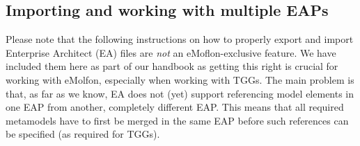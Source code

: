 \newpage
\hypertarget{multiEAP}{}
\subsection{Importing and working with multiple EAPs}
\visHeader

Please note that the following instructions on how to properly export and import Enterprise Architect (EA) files are \emph{not} an eMoflon-exclusive feature.
We have included them here as part of our handbook as getting this right is crucial for working with eMolfon, especially when working with TGGs. The main
problem is that, as far as we know, EA does not (yet) support referencing model elements in one EAP from another, completely different EAP. This means that all
required metamodels have to first be merged in the same EAP before such references can be specified (as required for TGGs).

